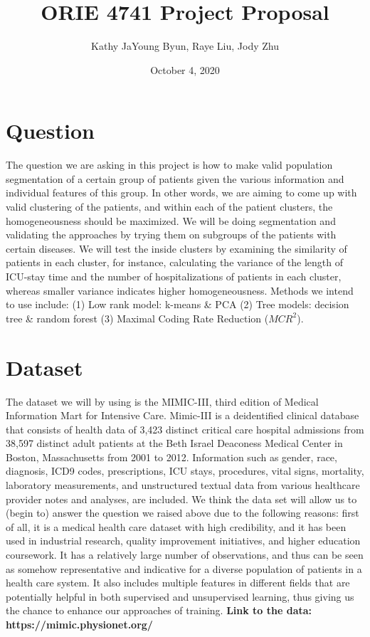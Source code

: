\documentclass{article}
\title{ORIE 4741 Project Proposal}
\author{Kathy JaYoung Byun, Raye Liu, Jody Zhu}
\date{October 4, 2020}
\begin{document}
\maketitle

\section{Question}
The question we are asking in this project is how to make valid population segmentation of a certain group of patients given the various information and individual features of this group. In other words, we are aiming to come up with valid clustering of the patients, and within each of the patient clusters, the homogeneousness should be maximized.
\newline
We will be doing segmentation and validating the approaches by trying them on subgroups of the patients with certain diseases. We will test the inside clusters by examining the similarity of patients in each cluster, for instance, calculating the variance of the length of ICU-stay time and the number of hospitalizations of patients in each cluster, whereas smaller variance indicates higher homogeneousness. 
\newline
Methods we intend to use include: (1) Low rank model: k-means \& PCA (2) Tree models: decision tree \& random forest (3) Maximal Coding Rate Reduction ($MCR^2$).

\section{Dataset}
The dataset we will by using is the MIMIC-III, third edition of Medical Information Mart for Intensive Care. Mimic-III is a deidentified clinical database that consists of health data of 3,423 distinct critical care hospital admissions from 38,597 distinct adult patients at the Beth Israel Deaconess Medical Center in Boston, Massachusetts from 2001 to 2012. Information such as gender, race, diagnosis, ICD9 codes, prescriptions, ICU stays, procedures, vital signs, mortality, laboratory measurements, and  unstructured textual data from various healthcare provider notes and analyses, are included.
\newline
We think the data set will allow us to (begin to) answer the question we raised above due to the following reasons: first of all, it is a medical health care dataset with high credibility, and it has been used in industrial research, quality improvement initiatives, and higher education coursework. It has a relatively large number of observations, and thus can be seen as somehow representative and indicative for a diverse population of patients in a health care system. It also includes multiple features in different fields that are potentially helpful in both supervised and unsupervised learning, thus giving us the chance to enhance our approaches of training.
\newline
\textbf{Link to the data: https://mimic.physionet.org/}
\end{document}
